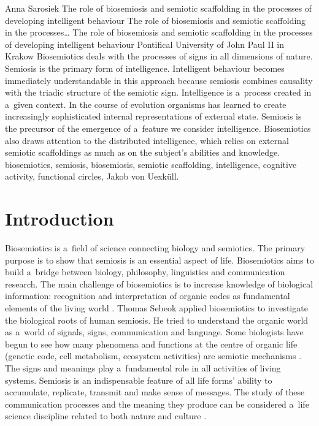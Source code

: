 \begin{artengenv}{Anna Sarosiek}
	{The role of biosemiosis and semiotic scaffolding in the processes of developing intelligent behaviour}
	{The role of biosemiosis and semiotic scaffolding in the processes\ldots}
	{The role of biosemiosis and semiotic scaffolding in the processes of developing intelligent behaviour}
	{Pontifical University of John Paul II in Krakow}
	{Biosemiotics deals with the processes of signs in all dimensions of nature. Semiosis is the primary form of intelligence. Intelligent behaviour becomes immediately understandable in this approach because semiosis combines causality with the triadic structure of the semiotic sign. Intelligence is a~process created in a~given context. In the course of evolution organisms has learned to create increasingly sophisticated internal representations of external state. Semiosis is the precursor of the emergence of a~feature we consider intelligence. Biosemiotics also draws attention to the distributed intelligence, which relies on external semiotic scaffoldings as much as on the subject’s abilities and knowledge.}
	{biosemiotics, semiosis, biosemiosis, semiotic scaffolding, intelligence, cognitive activity, functional circles, Jakob von Uexküll.}





\section*{Introduction }
Biosemiotics is a~field of science connecting biology and semiotics. The primary purpose is to show that semiosis is an essential aspect of life. Biosemiotics aims to build a~bridge between biology, philosophy, linguistics and communication research. The main challenge of biosemiotics is to increase knowledge of biological information: recognition and interpretation of organic codes as fundamental elements of the living world
\parencite[][]{barbieri_life_2005}. %
 Thomas Sebeok applied biosemiotics to investigate the biological roots of human semiosis. He tried to understand the organic world as a~world of signals, signs, communication and language. Some biologists have begun to see how many phenomena and functions at the centre of organic life (genetic code, cell metabolism, ecosystem activities) are semiotic mechanisms 
\parencite[][]{anderson_semiotic_1984}. %
 The signs and meanings play a~fundamental role in all activities of living systems. Semiosis is an indispensable feature of all life forms’ ability to accumulate, replicate, transmit and make sense of messages. The study of these communication processes and the meaning they produce can be considered a~life science discipline related to both nature and culture 
\parencite[][p.22]{sebeok_semiotic_1991}.%



\end{artengenv}
